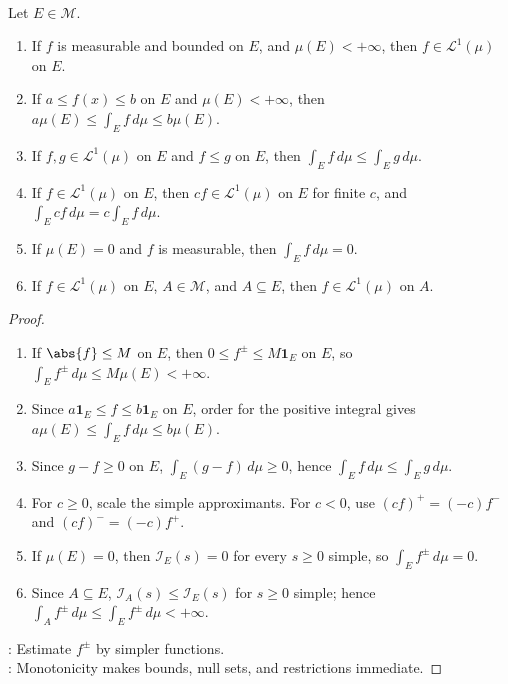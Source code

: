 \begin{proposition} \label{prop:basic-lebesgue-integral-properties} \\
Let $E\in\mathcal{M}$.
\begin{enumerate}[label=(\roman*)]
\setlength{\itemsep}{0pt}
\item If $f$ is measurable and bounded on $E$, and $\mu(E)<+\infty$, then $f\in\mathscr{L}^1(\mu)$ on $E$.
\item If $a\leq f(x)\leq b$ on $E$ and $\mu(E)<+\infty$, then $a\mu(E)\leq\int_E f\,d\mu\leq b\mu(E)$.
\item If $f,g\in\mathscr{L}^1(\mu)$ on $E$ and $f\leq g$ on $E$, then $\int_E f\,d\mu\leq\int_E g\,d\mu$.
\item If $f\in\mathscr{L}^1(\mu)$ on $E$, then $cf\in\mathscr{L}^1(\mu)$ on $E$ for finite $c$, and $\int_E cf\,d\mu=c\int_E f\,d\mu$.
\item If $\mu(E)=0$ and $f$ is measurable, then $\int_E f\,d\mu=0$.
\item If $f\in\mathscr{L}^1(\mu)$ on $E$, $A\in\mathcal{M}$, and $A\subseteq E$, then $f\in\mathscr{L}^1(\mu)$ on $A$.
\end{enumerate}
\begin{proof}
\begin{enumerate}[label=(\roman*)]
\setlength{\itemsep}{0pt}
\item If $\abs{f}\leq M$ on $E$, then $0\leq f^\pm\leq M\mathbf{1}_E$ on $E$, so $\int_Ef^\pm\,d\mu\leq M\mu(E)<+\infty$.
\item Since $a\mathbf{1}_E\leq f\leq b\mathbf{1}_E$ on $E$, order for the positive integral gives $a\mu(E)\leq\int_Ef\,d\mu\leq b\mu(E)$.
\item Since $g-f\geq0$ on $E$, $\int_E(g-f)\,d\mu\geq0$, hence $\int_Ef\,d\mu\leq\int_Eg\,d\mu$.
\item For $c\geq0$, scale the simple approximants. For $c<0$, use $(cf)^+=(-c)f^-$ and $(cf)^-=(-c)f^+$.
\item If $\mu(E)=0$, then $\mathcal{I}_E(s)=0$ for every $s\geq0$ simple, so $\int_Ef^\pm\,d\mu=0$.
\item Since $A\subseteq E$, $\mathcal{I}_A(s)\leq \mathcal{I}_E(s)$ for $s\geq0$ simple; hence $\int_Af^\pm\,d\mu\leq\int_Ef^\pm\,d\mu<+\infty$.
\end{enumerate}
: Estimate $f^\pm$ by simpler functions.\\
: Monotonicity makes bounds, null sets, and restrictions immediate.
\end{proof}
\end{proposition}


